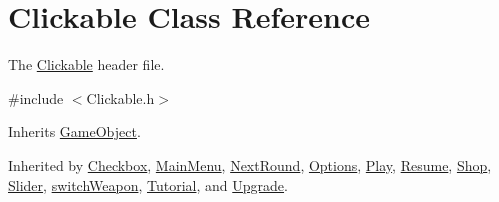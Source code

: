 \hypertarget{class_clickable}{\section{Clickable Class Reference}
\label{class_clickable}
}


The \hyperlink{class_clickable}{Clickable} header file.  




{\ttfamily \#include $<$Clickable.\+h$>$}



Inherits \hyperlink{class_game_object}{Game\+Object}.



Inherited by \hyperlink{class_checkbox}{Checkbox}, \hyperlink{class_main_menu}{Main\+Menu}, \hyperlink{class_next_round}{Next\+Round}, \hyperlink{class_options}{Options}, \hyperlink{class_play}{Play}, \hyperlink{class_resume}{Resume}, \hyperlink{class_shop}{Shop}, \hyperlink{class_slider}{Slider}, \hyperlink{classswitch_weapon}{switch\+Weapon}, \hyperlink{class_tutorial}{Tutorial}, and \hyperlink{class_upgrade}{Upgrade}.

